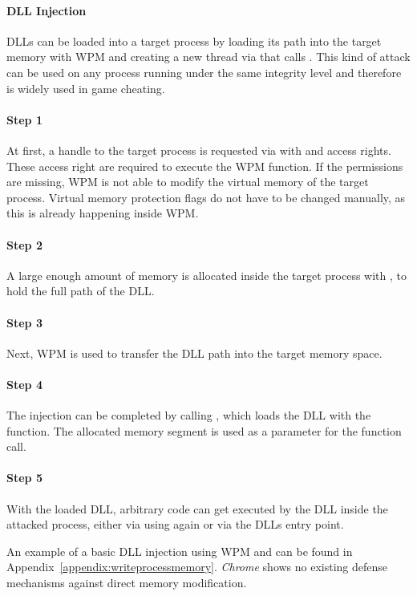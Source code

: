\paragraph{ \gls{DLL} Injection}
\glspl{DLL} can be loaded into a target process by loading its path into the target memory with \gls{WPM} and creating a new thread via  that calls . This kind of attack can be used on any process running under the same integrity level and therefore is widely used in game cheating.

\paragraph{Step 1} 
At first, a handle to the target process is requested via  with  and  access rights. These access right are required to execute the \gls{WPM} function. If the permissions are missing, \gls{WPM} is not able to modify the virtual memory of the target process. Virtual memory protection flags do not have to be changed manually, as this is already happening inside \gls{WPM}. 

\paragraph{Step 2} 
A large enough amount of memory is allocated inside the target process with , to hold the full path of the \gls{DLL}. 

\paragraph{Step 3}
Next, \gls{WPM} is used to transfer the \gls{DLL} path into the target memory space.

\paragraph{Step 4}
The injection can be completed by calling , which loads the \gls{DLL} with the  function. The allocated memory segment is used as a parameter for the  function call. 

\paragraph{Step 5}
With the loaded \gls{DLL}, arbitrary code can get executed by the \gls{DLL} inside the attacked process, either via using  again or via the \glspl{DLL} entry point.


An example of a basic \gls{DLL} injection using \gls{WPM} and  can be found in Appendix~\ref{appendix:writeprocessmemory}. \emph{Chrome} shows no existing defense mechanisms against direct memory modification.